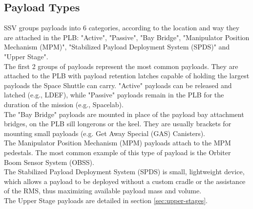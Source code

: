 \documentclass[Space_Shuttle_Vessel_Manual.tex]{subfiles}
\begin{document}
\begin{multicols*}{2}
\subsection{Payload Types}
\noindent
SSV groups payloads into 6 categories, according to the location and way they are attached in the PLB: "Active", "Passive", "Bay Bridge", "Manipulator Position Mechanism (MPM)", "Stabilized Payload Deployment System (SPDS)" and "Upper Stage".
\\
The first 2 groups of payloads represent the most common payloads. They are attached to the PLB with payload retention latches capable of holding the largest payloads the Space Shuttle can carry. "Active" payloads can be released and latched (e.g., LDEF), while "Passive" payloads remain in the PLB for the duration of the mission (e.g., Spacelab).
\\
The "Bay Bridge" payloads are mounted in place of the payload bay attachment bridges, on the PLB sill longerons or the keel. They are usually brackets for mounting small payloads (e.g. Get Away Special (GAS) Canisters).
\\
The Manipulator Position Mechanism (MPM) payloads attach to the MPM pedestals. The most common example of this type of payload is the Orbiter Boom Sensor System (OBSS).
\\
The Stabilized Payload Deployment System (SPDS) is small, lightweight device, which allows a payload to be deployed without a custom cradle or the assistance of the RMS, thus maximizing available payload mass and volume.
\\
The Upper Stage payloads are detailed in section \ref{sec:upper-stages}.



\end{multicols*}
\end{document}
